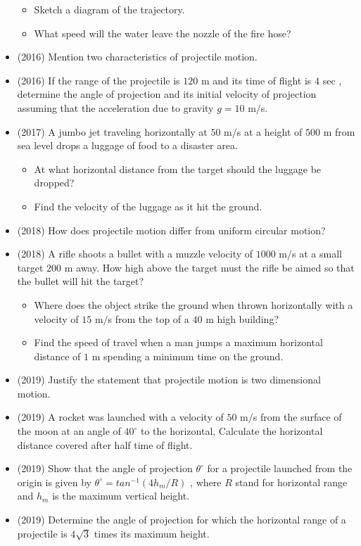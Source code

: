 \documentclass{article}
\begin{document}
\begin{itemize}
\begin{itemize}
\item  Sketch a diagram of the trajectory.
\item What speed will the water leave the nozzle of the fire hose?
\end{itemize}
\item (2016)  Mention two characteristics of projectile motion.
\item (2016)  If the range of the projectile is $ 120$ m and its time of flight is $ 4$ sec , determine the angle of projection and its initial velocity of projection assuming that the acceleration due to gravity $ g=10$ m$/$s. 
\item (2017)  A jumbo jet traveling horizontally at $ 50$ m$/$s at a height of $ 500$ m from sea level drops a luggage of food to a disaster area.\begin{itemize}
\item At what horizontal distance from the target should the luggage be dropped?
\item Find the velocity of the luggage as it hit the ground. 
\end{itemize}
\item (2018)  How does projectile motion differ from uniform circular motion? 
\item (2018)  A rifle shoots a bullet with a muzzle velocity of $ 1000$ m$/$s at a small target $ 200$ m away. How high above the target must the rifle be aimed so that the bullet will hit the target? \begin{itemize}
\item Where does the object strike the ground when thrown horizontally with a velocity of $ 15$ m$/$s from the top of a $ 40$ m high building? 
\item Find the speed of travel when a man jumps a maximum horizontal distance of $ 1$ m spending a minimum time on the ground.
\end{itemize}
\item (2019)  Justify the statement that projectile motion is two dimensional motion.
\item (2019)  A rocket was launched with a velocity of $ 50$ m$/$s from the surface of the moon at an angle of $ 40^{\circ}$ to the horizontal, Calculate the horizontal distance covered  after half time of flight.
\item (2019)  Show that the angle of projection $ \theta ^{\circ}$ for a projectile launched from the origin is given by $ \theta ^{\circ}= tan^{-1}(4h_{m}/R)$ , where $ R$ stand for horizontal range and $ h_{m}$ is the maximum vertical height.
\item (2019)  Determine the angle of projection for which the horizontal range of a projectile is $ 4\sqrt{3}$ times its maximum height. 
\end{itemize}
\end{document}
